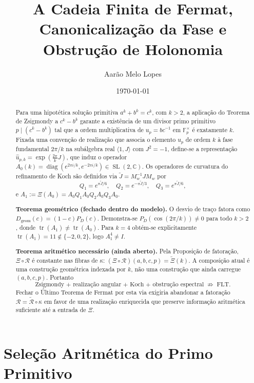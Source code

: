 \documentclass[11pt,a4paper]{article}
\title{\textbf{A Cadeia Finita de Fermat, Canonicalização da Fase e Obstrução de Holonomia}}
\author{Aarão Melo Lopes}
\date{\today}
\begin{document}
\maketitle

\begin{abstract}
Para uma hipotética solução primitiva $a^k+b^k=c^k$, com $k>2$, a aplicação do Teorema de Zsigmondy a $c^k-b^k$ garante a existência de um divisor primo primitivo $p \mid (c^k-b^k)$ tal que a ordem multiplicativa de $u_p = bc^{-1}$ em $\mathbb{F}_p^\times$ é exatamente $k$. Fixada uma convenção de realização que associa o elemento $u_p$ de ordem $k$ à fase fundamental $2\pi/k$ na subálgebra real $\langle 1, J \rangle$ com $J^2 = -1$, define-se a representação $\widehat{u}_{p,k} = \exp(\frac{2\pi}{k}J)$, que induz o operador $A_0(k) = \operatorname{diag}(e^{2\pi i/k}, e^{-2\pi i/k}) \in \operatorname{SL}(2,\mathbb{C})$. Os operadores de curvatura do refinamento de Koch são definidos via \(\widetilde{J}=M_w^{-1}JM_w\) por
\[
Q_1=e^{\pi\widetilde{J}/6},\quad
Q_2=e^{-\pi\widetilde{J}/3},\quad
Q_3=e^{\pi\widetilde{J}/6},
\]
e \(A_1:=\Xi(A_0)=A_0Q_1A_0Q_2A_0Q_3A_0\).

\textbf{Teorema geométrico (fechado dentro do modelo).}
O desvio de traço fatora como \(D_{\mathrm{geom}}(c)=(1-c)P_D(c)\). Demonstra-se \(P_D(\cos(2\pi/k))\neq0\) para todo \(k>2\), donde \(\operatorname{tr}(A_1)\neq\operatorname{tr}(A_0)\). Para \(k=4\) obtém-se explicitamente \(\operatorname{tr}(A_1)=11\notin\{-2,0,2\}\), logo \(A_1^4\neq I\).

\textbf{Teorema aritmético necessário (ainda aberto).}
Pela Proposição de fatoração, \(\Xi\circ\mathcal{R}\) é constante nas fibras de \(\kappa\): \((\Xi\circ\mathcal{R})(a,b,c,p)=\widetilde{\Xi}(k)\). A composição atual é uma construção geométrica indexada por \(k\), não uma construção que ainda carregue \((a,b,c,p)\). Portanto
\[
\text{Zsigmondy + realização angular + Koch + obstrução espectral}\;\not\Rightarrow\;\text{FLT}.
\]
Fechar o Último Teorema de Fermat por esta via exigiria abandonar a fatoração \(\mathcal{R}=\widetilde{\mathcal{R}}\circ\kappa\) em favor de uma realização enriquecida que preserve informação aritmética suficiente até a entrada de \(\Xi\).
\end{abstract}

\section{Seleção Aritmética do Primo Primitivo}
\end{document}
